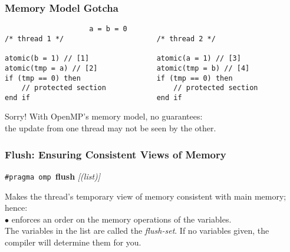 \documentclass[aspectratio=43]{beamer}
\newenvironment{changemargin}[1]{%
  \begin{list}{}{%
    \setlength{\topsep}{0pt}%
    \setlength{\leftmargin}{#1}%
    \setlength{\rightmargin}{1em}
    \setlength{\listparindent}{\parindent}%
    \setlength{\itemindent}{\parindent}%
    \setlength{\parsep}{\parskip}%
  }%
  \item[]}{\end{list}}
\begin{document}
\begin{frame}[fragile]
  \frametitle{Memory Model Gotcha}

  \begin{lstlisting}
                    a = b = 0
/* thread 1 */                      /* thread 2 */

atomic(b = 1) // [1]                atomic(a = 1) // [3]
atomic(tmp = a) // [2]              atomic(tmp = b) // [4]
if (tmp == 0) then                  if (tmp == 0) then
    // protected section                // protected section
end if                              end if
  \end{lstlisting}

  \begin{changemargin}{1.5cm}
    Sorry! With OpenMP's memory model, no guarantees:\\
    the update from one thread may not be seen by the other.
  \end{changemargin}
\end{frame}

\begin{frame}[fragile]
  \frametitle{Flush: Ensuring Consistent Views of Memory}

  \begin{center}
    {\tt \#pragma omp }{\bf flush} {\it[(list)]}
  \end{center}

  \begin{changemargin}{1.5cm}
    Makes the thread's temporary view of memory consistent with main
      memory; hence:\\[1em]
    $\bullet$ enforces an order on the memory operations of the variables.\\[1em]
    The variables in the list are called the {\it flush-set}. 
    If no variables given, the compiler will determine them for you.
  \end{changemargin}
\end{frame}
\end{document}
